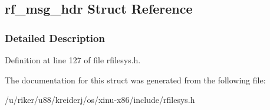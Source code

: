 \hypertarget{structrf__msg__hdr}{}\subsection{rf\+\_\+msg\+\_\+hdr Struct Reference}
\label{structrf__msg__hdr}


\subsubsection{Detailed Description}


Definition at line 127 of file rfilesys.\+h.



The documentation for this struct was generated from the following file\+:\begin{DoxyCompactItemize}
\item 
/u/riker/u88/kreiderj/os/xinu-\/x86/include/rfilesys.\+h\end{DoxyCompactItemize}
